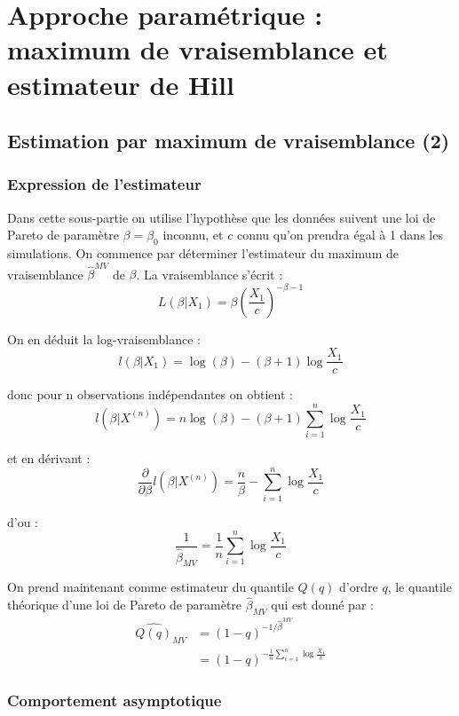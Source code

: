 \documentclass{article}
\renewcommand*{\(}{\left(}
\renewcommand*{\)}{\right)}
\begin{document}
\clearpage
\section{Approche paramétrique : maximum de vraisemblance et estimateur de Hill}

\subsection{Estimation par maximum de vraisemblance (2)}

\subsubsection{Expression de l'estimateur}

Dans cette sous-partie on utilise l'hypothèse que les données suivent une loi de Pareto de paramètre $\beta = \beta_0$ inconnu, et $c$ connu qu'on prendra égal à 1 dans les simulations. On commence par déterminer l'estimateur du maximum de vraisemblance  $\widehat{\beta}^{MV}$ de $\beta$. La vraisemblance s'écrit :
\[ L(\beta|X_1) = \beta \left( \frac{X_1}{c} \right)^{-\beta - 1} \]

\noindent On en déduit la log-vraisemblance :
\[ l(\beta|X_1) = \log(\beta) - (\beta + 1) \log \frac{X_{1}}{c} \]

\noindent donc pour n observations indépendantes on obtient :
\[ l\(\beta|X^{(n)}\) = n \log(\beta) - (\beta + 1) \sum_{i=1}^{n}\log \frac{X_1}{c} \]

\noindent et en dérivant :
\[ \frac{\partial}{\partial \beta} l\(\beta|X^{(n)}\) = \frac{n}{\beta} - \sum_{i=1}^{n}\log \frac{X_1}{c} \]

\noindent d'ou :
\[\frac{1}{\widehat{\beta}_{MV}} = \frac{1}{n} \sum_{i=1}^{n}\log \frac{X_1}{c} \]

On prend maintenant comme estimateur du quantile $Q(q)$ d'ordre $q$, le quantile théorique d'une loi de Pareto de paramètre $\widehat{\beta}_{MV}$ qui est donné par :
\begin{align*}
\widehat{Q(q)}_{MV} &= (1-q)^{-1/\widehat{\beta}^{MV}} \\
&=(1-q)^{- \frac{1}{n} \sum_{i=1}^{n}\log \frac{X_{1}}{c} }
\end{align*}


\subsubsection{Comportement asymptotique}
\end{document}
